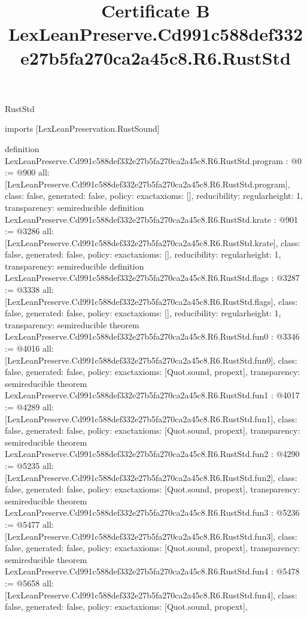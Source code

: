 \begin{lexlean}{RustStd}
\title{Certificate B LexLeanPreserve.Cd991c588def332e27b5fa270ca2a45c8.R6.RustStd}
\begin{coremodule}
imports [LexLeanPreservation.RustSound]

definition LexLeanPreserve.Cd991c588def332e27b5fa270ca2a45c8.R6.RustStd.program : @0 := @900 {
  all: [LexLeanPreserve.Cd991c588def332e27b5fa270ca2a45c8.R6.RustStd.program],
  class: false,
  generated: false,
  policy: exact{axioms: []},
  reducibility: regular{height: 1},
  transparency: semireducible
}
definition LexLeanPreserve.Cd991c588def332e27b5fa270ca2a45c8.R6.RustStd.krate : @901 := @3286 {
  all: [LexLeanPreserve.Cd991c588def332e27b5fa270ca2a45c8.R6.RustStd.krate],
  class: false,
  generated: false,
  policy: exact{axioms: []},
  reducibility: regular{height: 1},
  transparency: semireducible
}
definition LexLeanPreserve.Cd991c588def332e27b5fa270ca2a45c8.R6.RustStd.flags : @3287 := @3338 {
  all: [LexLeanPreserve.Cd991c588def332e27b5fa270ca2a45c8.R6.RustStd.flags],
  class: false,
  generated: false,
  policy: exact{axioms: []},
  reducibility: regular{height: 1},
  transparency: semireducible
}
theorem LexLeanPreserve.Cd991c588def332e27b5fa270ca2a45c8.R6.RustStd.fun0 : @3346 := @4016 {
  all: [LexLeanPreserve.Cd991c588def332e27b5fa270ca2a45c8.R6.RustStd.fun0],
  class: false,
  generated: false,
  policy: exact{axioms: [Quot.sound, propext]},
  transparency: semireducible
}
theorem LexLeanPreserve.Cd991c588def332e27b5fa270ca2a45c8.R6.RustStd.fun1 : @4017 := @4289 {
  all: [LexLeanPreserve.Cd991c588def332e27b5fa270ca2a45c8.R6.RustStd.fun1],
  class: false,
  generated: false,
  policy: exact{axioms: [Quot.sound, propext]},
  transparency: semireducible
}
theorem LexLeanPreserve.Cd991c588def332e27b5fa270ca2a45c8.R6.RustStd.fun2 : @4290 := @5235 {
  all: [LexLeanPreserve.Cd991c588def332e27b5fa270ca2a45c8.R6.RustStd.fun2],
  class: false,
  generated: false,
  policy: exact{axioms: [Quot.sound, propext]},
  transparency: semireducible
}
theorem LexLeanPreserve.Cd991c588def332e27b5fa270ca2a45c8.R6.RustStd.fun3 : @5236 := @5477 {
  all: [LexLeanPreserve.Cd991c588def332e27b5fa270ca2a45c8.R6.RustStd.fun3],
  class: false,
  generated: false,
  policy: exact{axioms: [Quot.sound, propext]},
  transparency: semireducible
}
theorem LexLeanPreserve.Cd991c588def332e27b5fa270ca2a45c8.R6.RustStd.fun4 : @5478 := @5658 {
  all: [LexLeanPreserve.Cd991c588def332e27b5fa270ca2a45c8.R6.RustStd.fun4],
  class: false,
  generated: false,
  policy: exact{axioms: [Quot.sound, propext]},
}
\end{coremodule}
\end{lexlean}
